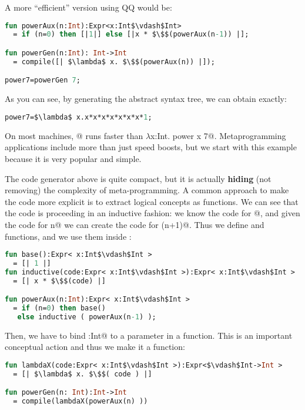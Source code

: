 \noindent A more ``efficient'' version using QQ would be:

\begin{lstlisting}[language=ML]
fun powerAux(n:Int):Expr<x:Int$\vdash$Int> 
  = if (n=0) then [|1|] else [|x * $\$$(powerAux(n-1)) |];

fun powerGen(n:Int): Int->Int
  = compile([| $\lambda$ x. $\$$(powerAux(n)) |]);

power7=powerGen 7;
\end{lstlisting}

\noindent As you can see, by generating the abstract syntax tree, we can obtain exactly:

\begin{lstlisting}[language=ML]
power7=$\lambda$ x.x*x*x*x*x*x*x*1;
\end{lstlisting}

\noindent On most machines, @ runs faster than $\lambda$\Q@ x:Int. power x 7@.
Metaprogramming applications include more than just speed boosts, but we start with this example because it is very popular and simple.

The code generator above is quite compact, but it is actually \textbf{hiding} (not removing) the complexity of meta-programming.
A common approach to make the code more explicit is to extract
logical concepts as functions.
We can see that the code is proceeding in an inductive fashion:
we know the code for @, and given the code for
\Q@pow n@  we can create the code for \Q@pow (n+1)@.
Thus we define \Q@base@ and \Q@inductive@ functions, and we
use them inside \Q@powerAux@:

\begin{lstlisting}[language=ML]
fun base():Expr< x:Int$\vdash$Int > 
  = [| 1 |]
fun inductive(code:Expr< x:Int$\vdash$Int >):Expr< x:Int$\vdash$Int >
  = [| x * $\$$(code) |]

fun powerAux(n:Int):Expr< x:Int$\vdash$Int >
  = if (n=0) then base()
   else inductive ( powerAux(n-1) );
\end{lstlisting}

\noindent Then, we have to bind \Q@x:Int@ to a parameter in a function.
This is an important conceptual action and thus we make it a function:

\begin{lstlisting}[language=ML]
fun lambdaX(code:Expr< x:Int$\vdash$Int >):Expr<$\vdash$Int->Int > 
  = [| $\lambda$ x. $\$$( code ) |]

fun powerGen(n: Int):Int->Int
  = compile(lambdaX(powerAux(n) ))
\end{lstlisting}

